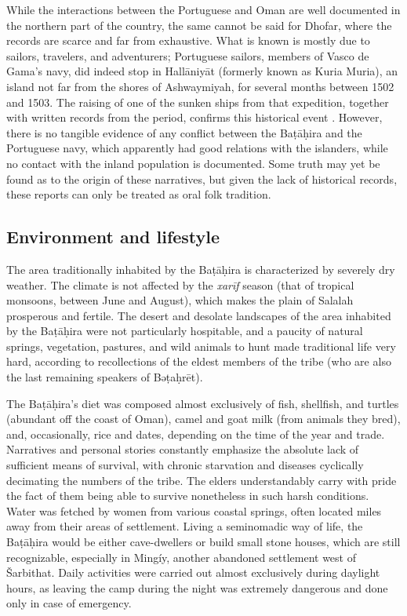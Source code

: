 \documentclass[output=paper]{langscibook}
\begin{document}
\hspace*{-1.6pt}While the interactions between the Portuguese and Oman are well documented in the northern part of the country, the same cannot be said for Dhofar, where the records are scarce and far from exhaustive. What is known is mostly due to sailors, travelers, and adventurers; Portuguese sailors, members of Vasco de Gama’s navy, did indeed stop in Hallāniyāt (formerly known as Kuria Muria), an island not far from the shores of Ashwaymiyah, for several months between 1502 and 1503. The raising of one of the sunken ships from that expedition, together with written records from the period, confirms this historical event \citep{mearns_portuguese_2016}. However, there is no tangible evidence of any conflict between the Baṭāḥira and the Portuguese navy, which apparently had good relations with the islanders, while no contact with the inland population is documented. Some truth may yet be found as to the origin of these narratives, but given the lack of historical records, these reports can only be treated as oral folk tradition.

\subsection{Environment and lifestyle}
The area traditionally inhabited by the Baṭāḥira is characterized by severely dry weather. The climate is not affected by the \textit{xarīf} season (that of tropical monsoons, between June and August), which makes the plain of Salalah prosperous and fertile. The desert and desolate landscapes of the area inhabited by the Baṭāḥira were not particularly hospitable, and a paucity of natural springs, vegetation, pastures, and wild animals to hunt made traditional life very hard, according to recollections of the eldest members of the tribe (who are also the last remaining speakers of Bəṭaḥrēt). 

The Baṭāḥira’s diet was composed almost exclusively of fish, shellfish, and turtles (abundant off the coast of Oman), camel and goat milk (from animals they bred), and, occasionally, rice and dates, depending on the time of the year and trade. Narratives and personal stories constantly emphasize the absolute lack of sufficient means of survival, with chronic starvation and diseases cyclically decimating the numbers of the tribe. The elders understandably carry with pride the fact of them being able to survive nonetheless in such harsh conditions. Water was fetched by women from various coastal springs, often located miles away from their areas of settlement. Living a seminomadic way of life, the Baṭāḥira would be either cave-dwellers or build small stone houses, which are still recognizable, especially in Mingíy, another abandoned settlement west of Šarbithat. Daily activities were carried out almost exclusively during daylight hours, as leaving the camp during the night was extremely dangerous and done only in case of emergency.
\end{document}
